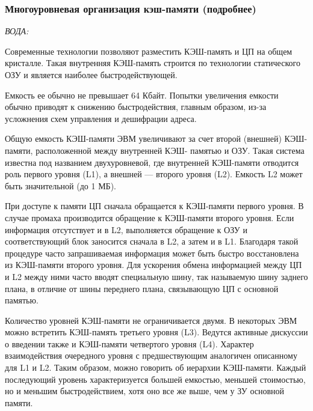 \subsubsection{Многоуровневая организация кэш-памяти (подробнее)}

\emph{ВОДА:}

Современные технологии позволяют разместить КЭШ-память и ЦП на общем кристалле. Такая внутренняя КЭШ-память строится по технологии статического ОЗУ и является наиболее быстродействующей. 

Емкость ее обычно не превышает 64 Кбайт. Попытки увеличения емкости обычно приводят к снижению быстродействия, главным образом, из-за усложнения схем управления и дешифрации адреса. 

Общую емкость КЭШ-памяти ЭВМ увеличивают за счет второй (внешней) КЭШ-памяти, расположенной между внутренней КЭШ- памятью и ОЗУ. Такая система известна под названием двухуровневой, где внутренней КЭШ-памяти отводится роль первого уровня (L1), а внешней — второго уровня (L2). Емкость L2 может быть значительной (до 1 МБ). 

При доступе к памяти ЦП сначала обращается к КЭШ-памяти первого уровня. В случае промаха производится обращение к КЭШ-памяти второго уровня. Если информация отсутствует и в L2, выполняется обращение к ОЗУ и соответствующий блок заносится сначала в L2, а затем и в L1. Благодаря такой процедуре часто запрашиваемая информация может быть быстро восстановлена из КЭШ-памяти второго уровня. Для ускорения обмена информацией между ЦП и L2 между ними часто вводят специальную шину, так называемую шину заднего плана, в отличие от шины переднего плана, связывающую ЦП с основной памятью. 

Количество уровней КЭШ-памяти не ограничивается двумя. В некоторых ЭВМ можно встретить КЭШ-память третьего уровня (L3). Ведутся активные дискуссии о введении также и КЭШ-памяти четвертого уровня (L4). Характер взаимодействия очередного уровня с предшествующим аналогичен описанному для L1 и L2. Таким образом, можно говорить об иерархии КЭШ-памяти. Каждый последующий уровень характеризуется большей емкостью, меньшей стоимостью, но и меньшим быстродействием, хотя оно все же выше, чем у ЗУ основной памяти.